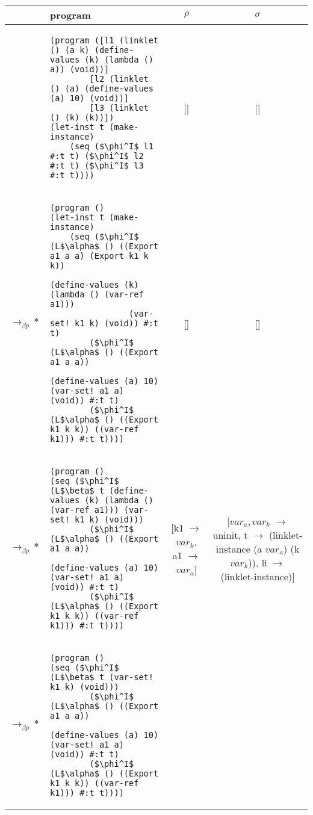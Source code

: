\begin{table}[!h]
  \footnotesize
  \begin{tabular}{l >{\centering\arraybackslash}m{} c c}  %
	&\textbf{program} & \textbf{$\rho$} & \textbf{$\sigma$} \\ \hline \hline
	&\begin{lstlisting}[style=numberless]
(program ([l1 (linklet () (a k) (define-values (k) (lambda () a)) (void))]
		[l2 (linklet () (a) (define-values (a) 10) (void))]
		[l3 (linklet () (k) (k))])
(let-inst t (make-instance)
	(seq ($\phi^I$ l1 #:t t) ($\phi^I$ l2 #:t t) ($\phi^I$ l3 #:t t))))
	\end{lstlisting} & [] & [] \\ \hline
	$\longrightarrow_{\beta p}*$&\begin{lstlisting}[style=numberless]
(program ()
(let-inst t (make-instance)
	(seq ($\phi^I$ (L$\alpha$ () ((Export a1 a a) (Export k1 k k))
				(define-values (k) (lambda () (var-ref a1)))
				(var-set! k1 k) (void)) #:t t)
		($\phi^I$ (L$\alpha$ () ((Export a1 a a))
				(define-values (a) 10) (var-set! a1 a) (void)) #:t t)
		($\phi^I$ (L$\alpha$ () ((Export k1 k k)) ((var-ref k1))) #:t t))))
	\end{lstlisting} & [] & [] \\ \hline
	$\longrightarrow_{\beta p}*$&\begin{lstlisting}[style=numberless]
(program ()
(seq ($\phi^I$ (L$\beta$ t (define-values (k) (lambda () (var-ref a1))) (var-set! k1 k) (void)))
		($\phi^I$ (L$\alpha$ () ((Export a1 a a))
				(define-values (a) 10) (var-set! a1 a) (void)) #:t t)
		($\phi^I$ (L$\alpha$ () ((Export k1 k k)) ((var-ref k1))) #:t t))))
	\end{lstlisting} & \thead{[k1 $\rightarrow$ $var_k$, \\a1 $\rightarrow$ $var_a$]} & \thead{[$var_a,var_k$ $\rightarrow$ uninit,\\ t $\rightarrow$ (linklet-instance \\ (a $var_a$) (k $var_k$)), \\li $\rightarrow$ (linklet-instance)]} \\ \hline
	$\longrightarrow_{\beta p}*$&\begin{lstlisting}[style=numberless]
(program ()
(seq ($\phi^I$ (L$\beta$ t (var-set! k1 k) (void)))
		($\phi^I$ (L$\alpha$ () ((Export a1 a a))
				(define-values (a) 10) (var-set! a1 a) (void)) #:t t)
		($\phi^I$ (L$\alpha$ () ((Export k1 k k)) ((var-ref k1))) #:t t))))

\end{lstlisting}
\end{tabular}
\end{table}
